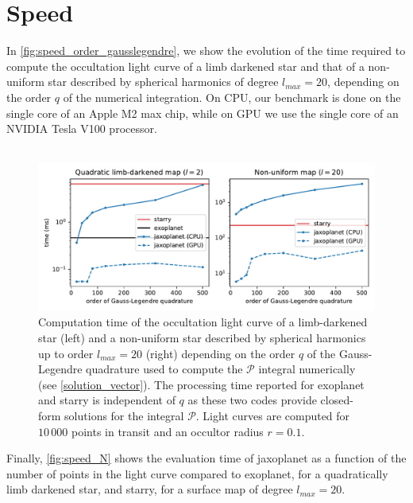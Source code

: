 \documentclass[modern]{aastex631}
\begin{document}
\section{Speed}\label{precise_speed}
In \autoref{fig:speed_order_gausslegendre}, we show the evolution of the time required to compute the occultation light curve of a limb darkened star and that of a non-uniform star described by spherical harmonics of degree $l_{max}=20$, depending on the order $q$ of the numerical integration. On CPU, our benchmark is done on the single core of an Apple M2 max chip, while on GPU we use the single core of an NVIDIA Tesla V100 processor.\\\\
\begin{figure}[H]
    \begin{center}
        \includegraphics[width=\textwidth]{../workflows/speed/figures/speed_vs_order.pdf}
        \caption{Computation time of the occultation light curve of a limb-darkened star (left) and a non-uniform star described by spherical harmonics up to order $l_{max}=20$ (right) depending on the order $q$ of the Gauss-Legendre quadrature used to compute the $\mathcal{P}$ integral numerically (see \autoref{solution_vector}). The processing time reported for \textsf{exoplanet} and \textsf{starry} is independent of $q$ as these two codes provide closed-form solutions for the integral $\mathcal{P}$. Light curves are computed for $10\,000$ points in transit and an occultor radius $r=0.1$.}
        \label{fig:speed_order_gausslegendre}
    \end{center}
\end{figure}
Finally, \autoref{fig:speed_N} shows the evaluation time of \textsf{jaxoplanet} as a function of the number of points in the light curve compared to \textsf{exoplanet}, for a quadratically limb darkened star, and \textsf{starry}, for a surface map of degree $l_{max} = 20$.
\end{document}
